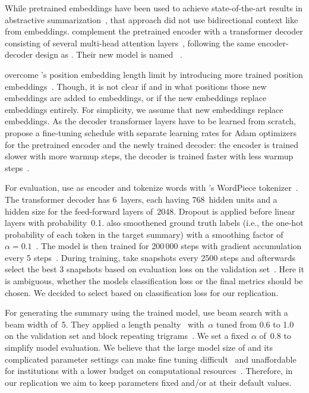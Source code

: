 While pretrained \Elmo embeddings have been used to achieve state-of-the-art results in abstractive summarization~\cite{EdunovBA2019}, that approach did not use bidirectional context like from \Bert embeddings. 
\citeauthor{LiuL2019} complement the pretrained \Bert encoder with a transformer decoder consisting of several multi-head attention layers~\cite{LiuL2019,DevlinCLT2019,VaswaniSPUJGKP2017}, following the same encoder-decoder design as \textcite{SeeLM2017}. Their new model is named \BertSumAbs~\cite{LiuL2019}.

\citeauthor{LiuL2019} overcome \Bert's position embedding length limit by introducing more trained position embeddings~\cite{LiuL2019}. Though, it is not clear if and in what positions those new embeddings are added to \Bert embeddings, or if the new embeddings replace \Bert embeddings entirely. For simplicity, we assume that new embeddings replace \Bert embeddings.
As the decoder transformer layers have to be learned from scratch, \citeauthor{LiuL2019} propose a fine-tuning schedule with separate learning rates for Adam optimizers for the pretrained \Bert encoder and the newly trained decoder: the encoder is trained slower with more warmup steps, the decoder is trained faster with less warmup steps~\cite{LiuL2019}.

For evaluation, \citeauthor{LiuL2019} use \BertBase as encoder and tokenize words with \Bert's WordPiece tokenizer~\cite{LiuL2019}.
The transformer decoder has 6~layers, each having 768~hidden units and a hidden size for the feed-forward layers of~2048. Dropout is applied before linear layers with probability~0.1.
\citeauthor{LiuL2019} also smoothened ground truth labels (i.e., the one-hot probability of each token in the target summary) with a smoothing factor of~\(\alpha = 0.1\)~\cite{LiuL2019,SzegedyVISW2016}.
The model is then trained for 200\,000 steps with gradient accumulation every 5 steps~\cite{LiuL2019}.
During training, \citeauthor{LiuL2019} take snapshots every 2500 steps and afterwards select the best 3 snapshots based on evaluation loss on the validation set~\cite{LiuL2019}.
Here it is ambiguous, whether the models classification loss or the final \Rouge metrics should be chosen. We decided to select based on classification loss for our replication.

For generating the summary using the trained model, \citeauthor{LiuL2019} use beam search with a beam width of~5. They applied a length penalty~\cite{WuSCLNMKCGMKSJL2016} with~\(\alpha\) tuned from 0.6 to 1.0 on the validation set and block repeating trigrams~\cite{PaulusXS2018}.
We set a fixed \(\alpha\) of~0.8 to simplify model evaluation.
We believe that the large model size of \BertSumAbs and its complicated parameter settings can make fine tuning difficult~\cite{AghajanyanSGGZG2020} and unaffordable for institutions with a lower budget on computational resources~\cite{JiaoYSJCL0L2020}.
Therefore, in our replication we aim to keep parameters fixed and/or at their default values.
